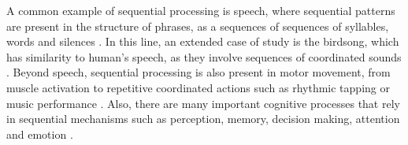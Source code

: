 







 A common example of sequential  processing is speech, where sequential patterns are present in the structure of phrases, as a sequences of sequences of syllables, words and silences \parencite{kiebel_recognizing_2009}. In this line, an extended case of study is the birdsong, which has  similarity to human's speech, as they involve sequences of coordinated sounds \parencite{prather_brains_2017,fishbein_sound_2019}. Beyond speech, sequential processing is also present in motor movement, from muscle activation to repetitive coordinated actions such as rhythmic tapping or music performance \parencite{ding_temporal_2017}. Also, there are many important cognitive processes that rely in sequential mechanisms such as perception, memory, decision making, attention and emotion \parencite{Varona2016, he_robust_2018, rabinovich_sequential_2020}.

